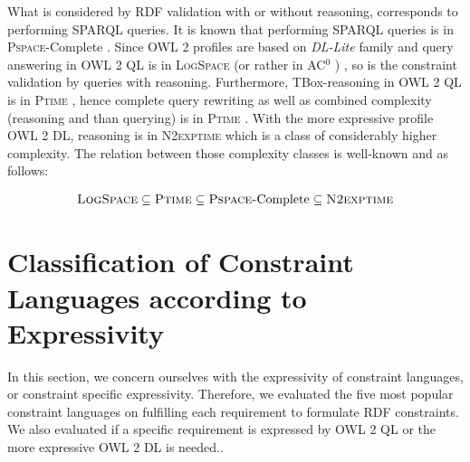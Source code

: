 \documentclass{llncs}
\begin{document}
What is considered by RDF validation with or without reasoning, corresponds to performing SPARQL queries.  It is known that performing SPARQL queries is in \textsc{Pspace}-Complete \cite{Perez2009}. Since OWL 2 profiles are based on \textit{DL-Lite} family and query answering in OWL 2 QL is in \textsc{LogSpace} (or rather in AC$^0$ ) \cite{Calvanese2007}, so is the constraint validation by queries with  reasoning. Furthermore, TBox-reasoning in OWL 2 QL is in \textsc{Ptime} \cite{Calvanese2007}, hence complete query rewriting as well as combined complexity (reasoning and than querying) is in \textsc{Ptime} \cite{Artale2009,Calvanese2007}.  With the more expressive profile OWL 2 DL, reasoning is in \textsc{N2exptime} \cite{owl2profiles2008} which is a class of considerably higher complexity.
The  relation between those complexity classes is well-known \cite{Arora:2009:CCM:1540612} and as follows:

\begin{eqnarray*}
\textsc{LogSpace} \subseteq \textsc{Ptime} \subseteq \textsc{Pspace-}\text{Complete} \subseteq \textsc{N2exptime} 
\end{eqnarray*}


\section{Classification of Constraint Languages according to Expressivity}
\label{Classification-Constraint-Languages-Expressivity-Complexity}
 
 In this section, we concern ourselves with the expressivity of constraint languages, or constraint specific expressivity.
Therefore, we evaluated the five most popular constraint languages on fulfilling each requirement to formulate RDF constraints.
We also evaluated if a specific requirement is expressed by OWL 2 QL or the more expressive OWL 2 DL is needed.\cite{BoschNolleAcarEckert2015}.
 
\end{document}
